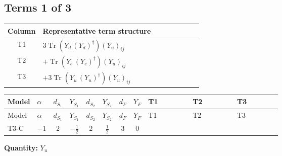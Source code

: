 \documentclass[8pt]{article}
\begin{document}
\begin{landscape}
\subsection*{Terms 1 of 3}
\begin{center}
\begin{tabular}{@{}c >{\raggedright\arraybackslash}p{0.82\linewidth}@{}}
\toprule
Column & Representative term structure \\
\midrule
T1 & \(\displaystyle 3 \operatorname{Tr}\!\left({Y_d}\,\left({Y_d}\right)^{\dagger}\right) \left({Y_u}\right)_{ij}\) \\
\midrule
T2 & \(\displaystyle +\operatorname{Tr}\!\left({Y_e}\,\left({Y_e}\right)^{\dagger}\right) \left({Y_u}\right)_{ij}\) \\
\midrule
T3 & \(\displaystyle +3 \operatorname{Tr}\!\left({Y_u}\,\left({Y_u}\right)^{\dagger}\right) \left({Y_u}\right)_{ij}\) \\
\midrule
\bottomrule
\end{tabular}
\end{center}
\smallskip
\tiny
\begin{longtable}{@{}llcccccc >{\raggedright\arraybackslash}p{0.21\linewidth} >{\raggedright\arraybackslash}p{0.21\linewidth} >{\raggedright\arraybackslash}p{0.21\linewidth}@{}}
\toprule
Model & $\alpha$ & $d_{S_1}$ & $Y_{S_1}$ & $d_{S_2}$ & $Y_{S_2}$ & $d_F$ & $Y_F$ & T1 & T2 & T3 \\
\midrule
\endfirsthead
\toprule
Model & $\alpha$ & $d_{S_1}$ & $Y_{S_1}$ & $d_{S_2}$ & $Y_{S_2}$ & $d_F$ & $Y_F$ & T1 & T2 & T3 \\
\midrule
\endhead
T3-C & $-1$ & $2$ & $-\frac{1}{2}$ & $2$ & $\frac{1}{2}$ & $3$ & $0$ & \scriptsize\adjustbox{max width=\linewidth}{$\begin{gathered} 3 \operatorname{Tr}\!\left({Y_d}\,\left({Y_d}\right)^{\dagger}\right) \left({Y_u}\right)_{ij}\end{gathered}$} & \scriptsize\adjustbox{max width=\linewidth}{$\begin{gathered} +\operatorname{Tr}\!\left({Y_e}\,\left({Y_e}\right)^{\dagger}\right) \left({Y_u}\right)_{ij}\end{gathered}$} & \scriptsize\adjustbox{max width=\linewidth}{$\begin{gathered} +3 \operatorname{Tr}\!\left({Y_u}\,\left({Y_u}\right)^{\dagger}\right) \left({Y_u}\right)_{ij}\end{gathered}$} \\
\midrule
\bottomrule
\end{longtable}
\clearpage
\noindent\textbf{Quantity: }$Y_u$\par\smallskip

\end{landscape}
\end{document}
